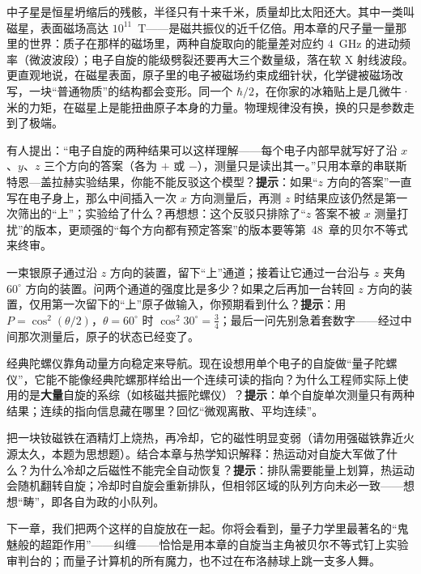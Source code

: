 
\begin{thought}[磁星：把自旋物理推到宇宙的极端]
中子星是恒星坍缩后的残骸，半径只有十来千米，质量却比太阳还大。其中一类叫磁星，表面磁场高达 $10^{11}$~T——是磁共振仪的近千亿倍。用本章的尺子量一量那里的世界：质子在那样的磁场里，两种自旋取向的能量差对应约 $4$~GHz 的进动频率（微波波段）；电子自旋的能级劈裂还要再大三个数量级，落在软 X 射线波段。更直观地说，在磁星表面，原子里的电子被磁场约束成细针状，化学键被磁场改写，一块“普通物质”的结构都会变形。同一个 $\hbar/2$，在你家的冰箱贴上是几微牛·米的力矩，在磁星上是能扭曲原子本身的力量。物理规律没有换，换的只是参数走到了极端。
\end{thought}

\begin{puzzles}
\item 有人提出：“电子自旋的两种结果可以这样理解——每个电子内部早就写好了沿 $x$、$y$、$z$ 三个方向的答案（各为 $+$ 或 $-$），测量只是读出其一。”只用本章的串联斯特恩—盖拉赫实验结果，你能不能反驳这个模型？\textbf{提示}：如果“$z$ 方向的答案”一直写在电子身上，那么中间插入一次 $x$ 方向测量后，再测 $z$ 时结果应该仍然是第一次筛出的“上”；实验给了什么？再想想：这个反驳只排除了“$z$ 答案不被 $x$ 测量打扰”的版本，更顽强的“每个方向都有预定答案”的版本要等第~48~章的贝尔不等式来终审。
\item 一束银原子通过沿 $z$ 方向的装置，留下“上”通道；接着让它通过一台沿与 $z$ 夹角 $60^\circ$ 方向的装置。问两个通道的强度比是多少？如果之后再加一台转回 $z$ 方向的装置，仅用第一次留下的“上”原子做输入，你预期看到什么？\textbf{提示}：用 $P=\cos^2(\theta/2)$，$\theta=60^\circ$ 时 $\cos^2 30^\circ=\tfrac34$；最后一问先别急着套数字——经过中间那次测量后，原子的状态已经变了。
\item 经典陀螺仪靠角动量方向稳定来导航。现在设想用单个电子的自旋做“量子陀螺仪”，它能不能像经典陀螺那样给出一个连续可读的指向？为什么工程师实际上使用的是\textbf{大量}自旋的系综（如核磁共振陀螺仪）？\textbf{提示}：单个自旋单次测量只有两种结果；连续的指向信息藏在哪里？回忆“微观离散、平均连续”。
\item 把一块钕磁铁在酒精灯上烧热，再冷却，它的磁性明显变弱（请勿用强磁铁靠近火源太久，本题为思想题）。结合本章与热学知识解释：热运动对自旋大军做了什么？为什么冷却之后磁性不能完全自动恢复？\textbf{提示}：排队需要能量上划算，热运动会随机翻转自旋；冷却时自旋会重新排队，但相邻区域的队列方向未必一致——想想“畴”，即各自为政的小队列。
\end{puzzles}

下一章，我们把两个这样的自旋放在一起。你将会看到，量子力学里最著名的“鬼魅般的超距作用”——纠缠——恰恰是用本章的自旋当主角被贝尔不等式钉上实验审判台的；而量子计算机的所有魔力，也不过在布洛赫球上跳一支多人舞。
